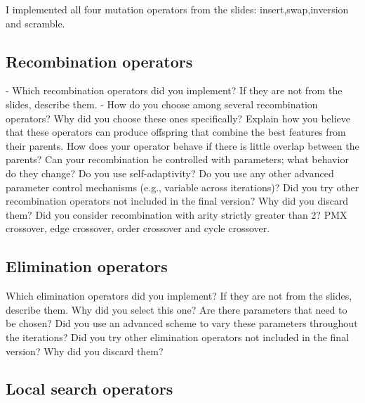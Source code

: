 \documentclass[a4paper,10pt]{article}
\newcommand{\ReplaceMe}[1]{{\color{blue}#1}}
\begin{document}
\begin{comment}
    Which mutation operators did you implement? If they are not from the slides, describe them. How do you choose among several mutation operators? Do you believe it will introduce sufficient randomness? Can that be controlled with parameters? Do you use self-adaptivity? Do you use any other advanced parameter control mechanisms (e.g., variable across iterations)? Did you try other mutation operators not included in the final version? Why did you discard them?
\end{comment}
I implemented all four mutation operators from the slides: insert,swap,inversion and scramble. 

\subsection{Recombination operators}

\ReplaceMe{
- Which recombination operators did you implement? If they are not from the slides, describe them. 
- How do you choose among several recombination operators? Why did you choose these ones specifically? Explain how you believe that these operators can produce offspring that combine the best features from their parents. How does your operator behave if there is little overlap between the parents? Can your recombination be controlled with parameters; what behavior do they change? Do you use self-adaptivity? Do you use any other advanced parameter control mechanisms (e.g., variable across iterations)? Did you try other recombination operators not included in the final version? Why did you discard them? Did you consider recombination with arity strictly greater than 2?}
PMX crossover, edge crossover, order crossover and cycle crossover. 

\subsection{Elimination operators}

\ReplaceMe{Which elimination operators did you implement? If they are not from the slides, describe them. Why did you select this one? Are there parameters that need to be chosen? Did you use an advanced scheme to vary these parameters throughout the iterations? Did you try other elimination operators not included in the final version? Why did you discard them?} 

\subsection{Local search operators}
\end{document}
